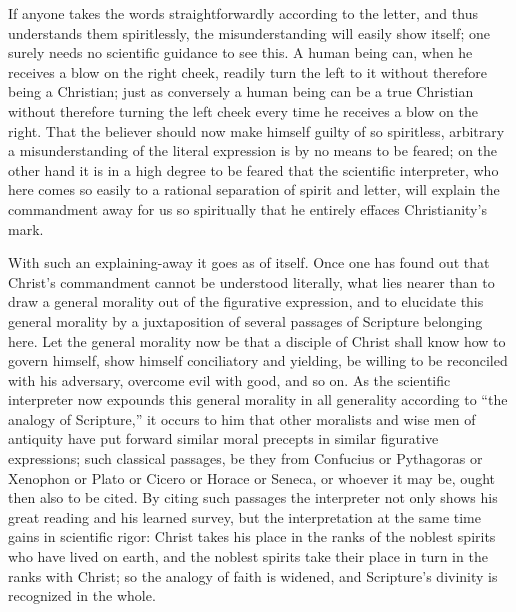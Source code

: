 \documentclass[12pt,a4paper]{book}
\begin{document}
If anyone takes the words straightforwardly according to the letter, and thus
understands them spiritlessly, the misunderstanding will easily show itself; one
surely needs no scientific guidance to see this. A human being can, when he receives
a blow on the right cheek, readily turn the left to it without therefore being a
Christian; just as conversely a human being can be a true Christian without therefore
turning the left cheek every time he receives a blow on the right. That the believer
should now make himself guilty of so spiritless, arbitrary a misunderstanding of the
literal expression is by no means to be feared; on the other hand it is in a high
degree to be feared that the scientific interpreter, who here comes so easily to a
rational separation of spirit and letter, will explain the commandment away for us so
spiritually that he entirely effaces Christianity's mark.

With such an explaining-away it goes as of itself. Once one has found out that
Christ's commandment cannot be understood literally, what lies nearer than to draw a
general morality out of the figurative expression, and to elucidate this general
morality by a juxtaposition of several passages of Scripture belonging here. Let the
general morality now be that a disciple of Christ shall know how to govern himself,
show himself conciliatory and yielding, be willing to be reconciled with his
adversary, overcome evil with good, and so on. As the scientific interpreter now
expounds this general morality in all generality according to ``the analogy of
Scripture,'' it occurs to him that other
moralists and wise men of antiquity have put forward similar moral precepts in
similar figurative expressions; such classical passages, be they from Confucius or
Pythagoras or Xenophon or Plato or Cicero or Horace or Seneca, or whoever it may be,
ought then also to be cited. By citing such passages the interpreter not only shows
his great reading and his learned survey, but the interpretation at the same time
gains in scientific rigor: Christ takes his place in the ranks of the noblest spirits
who have lived on earth, and the noblest spirits take their place in turn in the
ranks with Christ; so the analogy of faith is widened, and Scripture's divinity is
recognized in the whole.
\end{document}
